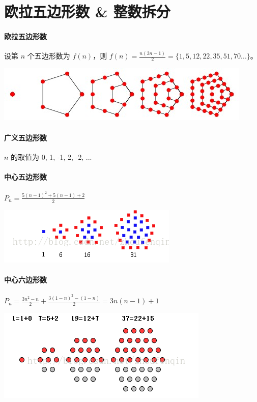 \section{欧拉五边形数 \& 整数拆分}

\paragraph{欧拉五边形数} 设第 $n$ 个五边形数为 $f(n)$，则 $f(n) = \frac{n(3n-1)}{2} = \{1, 5, 12, 22, 35, 51, 70...\}$。
 
\includegraphics{chapters/ch5-math/images/Untitled.png}

\paragraph{广义五边形数} $n$ 的取值为 0, 1, -1, 2, -2, ...

\paragraph{中心五边形数} $P_n = \frac{5(n-1)^2+5(n-1)+2}{2}$

\includegraphics{chapters/ch5-math/images/Untitled 1.png}

\paragraph{中心六边形数} $P_n = \frac{3n^2-n}{2} + \frac{3(1-n)^2-(1-n)}{2} = 3n(n-1) + 1$

\includegraphics{chapters/ch5-math/images/Untitled 2.png}

